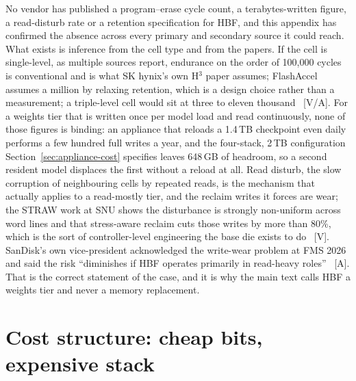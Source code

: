 No vendor has published a program--erase cycle count, a terabytes-written figure, a read-disturb rate or a retention specification for HBF, and this appendix has confirmed the absence across every primary and secondary source it could reach. What exists is inference from the cell type and from the papers. If the cell is single-level, as multiple sources report, endurance on the order of 100,000 cycles is conventional and is what SK hynix's own H$^3$ paper assumes; FlashAccel assumes a million by relaxing retention, which is a design choice rather than a measurement; a triple-level cell would sit at three to eleven thousand~\cite{hbf-h3,hbf-flashaccel,hbf-semieng} [V/A]. For a weights tier that is written once per model load and read continuously, none of those figures is binding: an appliance that reloads a 1.4\,TB checkpoint even daily performs a few hundred full writes a year, and the four-stack, 2\,TB configuration Section~\ref{sec:appliance-cost} specifies leaves 648\,GB of headroom, so a second resident model displaces the first without a reload at all. Read disturb, the slow corruption of neighbouring cells by repeated reads, is the mechanism that actually applies to a read-mostly tier, and the reclaim writes it forces are wear; the STRAW work at SNU shows the disturbance is strongly non-uniform across word lines and that stress-aware reclaim cuts those writes by more than 80\%, which is the sort of controller-level engineering the base die exists to do~\cite{hbf-straw} [V]. SanDisk's own vice-president acknowledged the write-wear problem at FMS 2026 and said the risk ``diminishes if HBF operates primarily in read-heavy roles''~\cite{hbf-businesskorea} [A]. That is the correct statement of the case, and it is why the main text calls HBF a weights tier and never a memory replacement.

\section{Cost structure: cheap bits, expensive stack}

